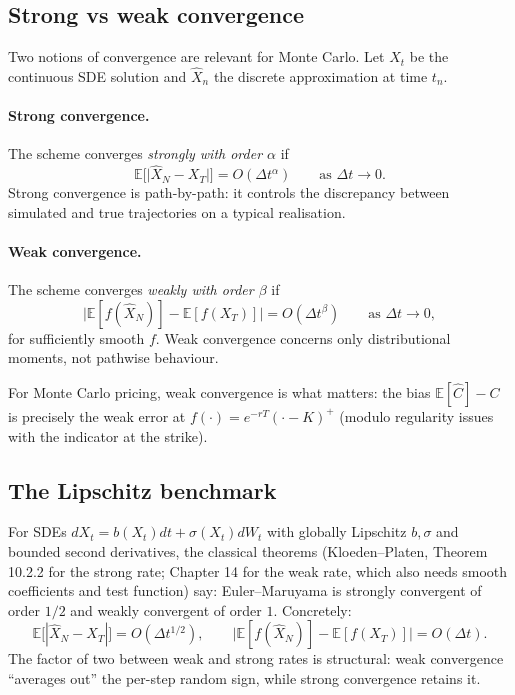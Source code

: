 \documentclass[11pt]{article}
\theoremstyle{plain}
\theoremstyle{definition}
\theoremstyle{remark}
\begin{document}
\subsection{Strong vs weak convergence}

Two notions of convergence are relevant for Monte Carlo. Let $X_t$ be the continuous SDE solution and $\hat X_n$ the discrete approximation at time $t_n$.

\paragraph{Strong convergence.} The scheme converges \emph{strongly with order $\alpha$} if
\[
    \mathbb{E}\bigl[\bigl|\hat X_N - X_T\bigr|\bigr] = O(\Delta t^\alpha) \qquad \text{as } \Delta t \to 0.
\]
Strong convergence is path-by-path: it controls the discrepancy between simulated and true trajectories on a typical realisation.

\paragraph{Weak convergence.} The scheme converges \emph{weakly with order $\beta$} if
\[
    \bigl|\mathbb{E}[f(\hat X_N)] - \mathbb{E}[f(X_T)]\bigr| = O(\Delta t^\beta) \qquad \text{as } \Delta t \to 0,
\]
for sufficiently smooth $f$. Weak convergence concerns only distributional moments, not pathwise behaviour.

For Monte Carlo pricing, weak convergence is what matters: the bias $\mathbb{E}[\widehat C] - C$ is precisely the weak error at $f(\cdot) = e^{-rT}(\cdot - K)^+$ (modulo regularity issues with the indicator at the strike).

\subsection{The Lipschitz benchmark}

For SDEs $dX_t = b(X_t)dt + \sigma(X_t)dW_t$ with globally Lipschitz $b, \sigma$ and bounded second derivatives, the classical theorems (Kloeden--Platen, Theorem 10.2.2 for the strong rate; Chapter 14 for the weak rate, which also needs smooth coefficients and test function) say: Euler--Maruyama is strongly convergent of order $1/2$ and weakly convergent of order $1$. Concretely:
\[
    \mathbb{E}\bigl[|\hat X_N - X_T|\bigr] = O(\Delta t^{1/2}), \qquad \bigl|\mathbb{E}[f(\hat X_N)] - \mathbb{E}[f(X_T)]\bigr| = O(\Delta t).
\]
The factor of two between weak and strong rates is structural: weak convergence ``averages out'' the per-step random sign, while strong convergence retains it.
\end{document}
